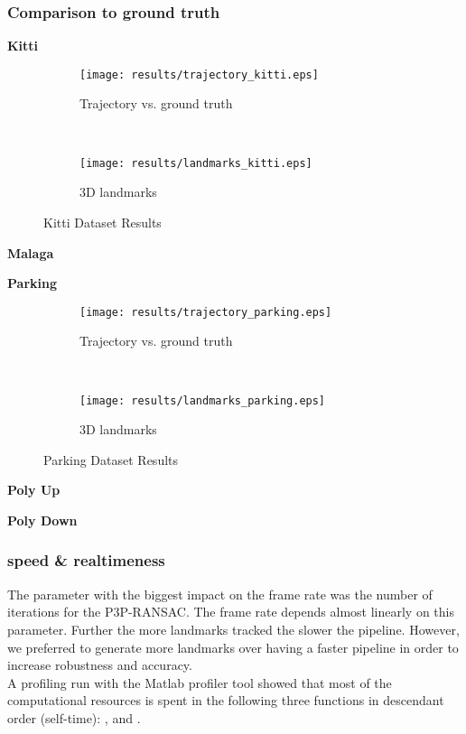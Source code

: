 \subsubsection{Comparison to ground truth}
\textbf{Kitti}
\begin{figure*}[ht!]
    \centering
    \begin{subfigure}[t]{0.5\textwidth}
        \centering
        \texttt{[image: results/trajectory\_kitti.eps]}
        \caption{Trajectory vs. ground truth}
    \end{subfigure}%
    ~ 
    \begin{subfigure}[t]{0.5\textwidth}
        \centering
        \texttt{[image: results/landmarks\_kitti.eps]}
        \caption{3D landmarks}
    \end{subfigure}
    \caption{Kitti Dataset Results}
		\label{parking_result_fig}
\end{figure*}

\textbf{Malaga}


\textbf{Parking}
\begin{figure*}[ht!]
    \centering
    \begin{subfigure}[t]{0.5\textwidth}
        \centering
        \texttt{[image: results/trajectory\_parking.eps]}
        \caption{Trajectory vs. ground truth}
    \end{subfigure}%
    ~ 
    \begin{subfigure}[t]{0.5\textwidth}
        \centering
        \texttt{[image: results/landmarks\_parking.eps]}
        \caption{3D landmarks}
    \end{subfigure}
    \caption{Parking Dataset Results}
		\label{parking_result_fig}
\end{figure*}

\textbf{Poly Up}

\textbf{Poly Down}

\subsubsection{speed \& realtimeness}
The parameter with the biggest impact on the frame rate was the number of iterations for the P3P-RANSAC. The frame rate depends almost linearly on this parameter. Further the more landmarks tracked the slower the pipeline. However, we preferred to generate more landmarks over having a faster pipeline in order to increase robustness and accuracy.\\

A profiling run with the Matlab profiler tool showed that most of the computational resources is spent in the following three functions in descendant order (self-time): ,  and .


